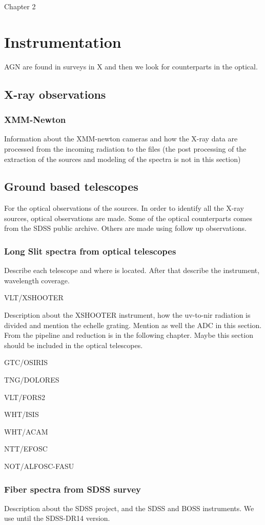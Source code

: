 Chapter 2

\chapter{Instrumentation} %
\label{chap:ins}

AGN are found in surveys in X and then we look for counterparts in the optical.

\section{X-ray observations}
\label{sec2:xr}


\subsection{XMM-Newton}
\label{sec2:xmm}
Information about the XMM-newton cameras and how the X-ray data are processed from the incoming radiation to the files (the post processing of the extraction of the sources and modeling of the spectra is not in this section)



\section{Ground based telescopes}
\label{sec2:tel}

For the optical observations of the sources. In order to identify all the X-ray sources, optical observations are made. Some of the optical counterparts comes from the SDSS public archive. Others are made using follow up observations.



\subsection{Long Slit spectra from optical telescopes}
\label{sec2:otel}

Describe each telescope and where is located. After that describe the instrument, wavelength coverage.

VLT/XSHOOTER

Description about the XSHOOTER instrument, how the uv-to-nir radiation is divided and mention the echelle grating. Mention as well the ADC in this section. From the pipeline and reduction is in the following chapter. Maybe this section should be included in the optical telescopes.

GTC/OSIRIS

TNG/DOLORES

VLT/FORS2

WHT/ISIS

WHT/ACAM

NTT/EFOSC

NOT/ALFOSC-FASU

\subsection{Fiber spectra from SDSS survey}
\label{sec2:sdss}

Description about the SDSS project, and the SDSS and BOSS instruments. We use until the SDSS-DR14 version.
